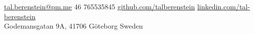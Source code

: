 \documentclass[10pt,a4paper]{article}
\begin{document}
\sloppy  %



\nobreakvspace{0.3em}  %

\noindent\href{mailto:tal.berenstein@pm.me}{tal.berenstein\mbox{}@\mbox{}pm.me}\sbull
\textsmaller{+}46 765535845\sbull
\href{https://github.com/talberenstein}{github.com/talberenstein}\sbull
\href{https://linkedin.com/in/tali-berenstein-torres-94055726b/}{linkedin.com/tal-berenstein}
\\
Godemansgatan 9A,
41706\thinspace {\large \sc }\sbull
Göteborg\sbull
Sweden

\spacedhrule{0.9em}{-0.4em}  %

\end{document}
